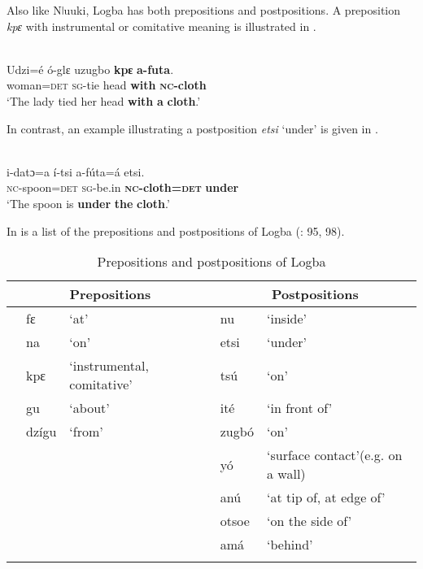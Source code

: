 \documentclass[output=paper]{langsci/langscibook}
\begin{document}
Also like Nǀuuki, Logba has both prepositions and postpositions. A preposition \textit{kpɛ} with instrumental or comitative meaning is illustrated in .

\ea\label{ex:dryer:19}
\\
\gll Udzi=é  ó-glɛ  uzugbo  \textbf{kpɛ}  \textbf{a-futa}.\\
       woman=\textsc{det}  \textsc{sg}{}-tie  head  \textbf{with}  \textbf{\textsc{nc}}\textbf{{}-cloth}  \\
\glt ‘The lady tied her head \textbf{with} \textbf{a} \textbf{cloth}.’  
\z

In contrast, an example illustrating a postposition \textit{etsi} ‘under’ is given in .

\ea\label{ex:dryer:20}
\\
\gll i-datɔ=a  í-tsi  a-fúta=á  etsi.\\
       \textsc{nc}{}-spoon=\textsc{det}  \textsc{sg}{}-be.in  \textbf{\textsc{nc}}\textbf{{}-cloth=}\textbf{\textsc{det}}  \textbf{under}\\
\glt   ‘The spoon is \textbf{under} \textbf{the} \textbf{cloth}.’ 
\z

In  is a list of the prepositions and postpositions of Logba (\citealt{Dorvlo2008}: 95, 98).


\begin{table}
\caption{Prepositions and postpositions of Logba }
\label{extab:dryer:21}
\begin{tabularx}{\textwidth}{lll lll}
\lsptoprule
 & \multicolumn{2}{c}{\bfseries Prepositions} &  & \multicolumn{2}{c}{\bfseries Postpositions}\\
 \midrule 
 & fɛ & ‘at’ &  & nu & ‘inside’\\
 & na & ‘on’ &  & etsi & ‘under’\\
 & kpɛ & ‘instrumental, comitative’ &  & tsú & ‘on’\\
 & gu & ‘about’ &  & ité & ‘in front of’\\
 & dzígu & ‘from’ &  & zugbó & ‘on’\\
 &  &  &  & yó & {‘surface contact’}\newline (e.g. on a wall)\\
 &  &  &  & anú & ‘at tip of, at edge of’\\
 &  &  &  & otsoe & ‘on the side of’\\
 &  &  &  & amá & ‘behind’\\
\lspbottomrule
\end{tabularx}
\end{table}
\end{document}
